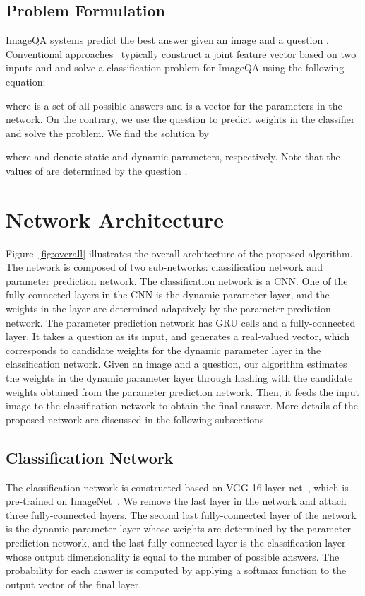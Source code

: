 \documentclass[10pt,twocolumn,letterpaper]{article}
\begin{document}
\subsection{Problem Formulation}


ImageQA systems predict the best answer  given an image  and a question .
Conventional approaches~\cite{Convqa, mren2015} typically construct a joint feature vector based on two inputs  and  and solve a classification problem for ImageQA using the following equation:

where  is a set of all possible answers and  is a vector for the parameters in the network. 
On the contrary, we use the question to predict weights in the classifier and solve the problem.
We find the solution by 

where  and  denote static and dynamic parameters, respectively.
Note that the values of  are determined by the question .



\section{Network Architecture}
\label{sec:architecture}


Figure~\ref{fig:overall} illustrates the overall architecture of the proposed algorithm.
The network is composed of two sub-networks: classification network and parameter prediction network.
The classification network is a CNN.
One of the fully-connected layers in the CNN is the dynamic parameter layer, and the weights in the layer are determined adaptively by the parameter prediction network.
The parameter prediction network has GRU cells and a fully-connected layer.
It takes a question as its input, and generates a real-valued vector, which corresponds to candidate weights for the dynamic parameter layer in the classification network.
Given an image and a question, our algorithm estimates the weights in the dynamic parameter layer through hashing with the candidate weights obtained from the parameter prediction network.
Then, it feeds the input image to the classification network to obtain the final answer.
More details of the proposed network are discussed in the following subsections.

\subsection{Classification Network}




The classification network is constructed based on VGG 16-layer net~\cite{Vgg16}, which is pre-trained on ImageNet~\cite{ImageNet}.
We remove the last layer in the network and attach three fully-connected layers.
The second last fully-connected layer of the network is the dynamic parameter layer whose weights are determined by the parameter prediction network, and the last fully-connected layer is the classification layer whose output dimensionality is equal to the number of possible answers.
The probability for each answer is computed by applying a softmax function to the output vector of the final layer.
\end{document}
